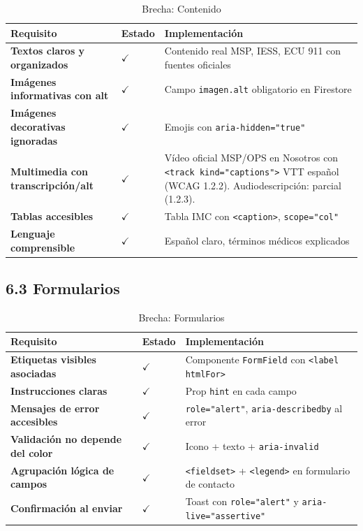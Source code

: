 \documentclass[12pt, a4paper]{article}
\newcommand{\cmark}{\textcolor{successgreen}{$\checkmark$}}
\begin{document}
\begin{table}[H]
\centering
\caption{Brecha: Contenido}
\small
\begin{tabular}{@{}>{\bfseries}p{5cm} >{\centering\arraybackslash}p{2cm} p{6.5cm}@{}}
\toprule
\rowcolor{royalblue!12}
\textbf{Requisito} & \textbf{Estado} & \textbf{Implementación} \\
\midrule
Textos claros y organizados & \cmark & Contenido real MSP, IESS, ECU 911 con fuentes oficiales \\
Imágenes informativas con alt & \cmark & Campo \texttt{imagen.alt} obligatorio en Firestore \\
Imágenes decorativas ignoradas & \cmark & Emojis con \texttt{aria-hidden="true"} \\
Multimedia con transcripción/alt & \cmark & Vídeo oficial MSP/OPS en Nosotros con \texttt{<track kind="captions">} VTT español (WCAG 1.2.2). Audiodescripción: parcial (1.2.3). \\
Tablas accesibles & \cmark & Tabla IMC con \texttt{<caption>}, \texttt{scope="col"} \\
Lenguaje comprensible & \cmark & Español claro, términos médicos explicados \\
\bottomrule
\end{tabular}
\end{table}

\subsection{6.3 Formularios}

\begin{table}[H]
\centering
\caption{Brecha: Formularios}
\small
\begin{tabular}{@{}>{\bfseries}p{5cm} >{\centering\arraybackslash}p{2cm} p{6.5cm}@{}}
\toprule
\rowcolor{royalblue!12}
\textbf{Requisito} & \textbf{Estado} & \textbf{Implementación} \\
\midrule
Etiquetas visibles asociadas & \cmark & Componente \texttt{FormField} con \texttt{<label htmlFor>} \\
Instrucciones claras & \cmark & Prop \texttt{hint} en cada campo \\
Mensajes de error accesibles & \cmark & \texttt{role="alert"}, \texttt{aria-describedby} al error \\
Validación no depende del color & \cmark & Icono + texto + \texttt{aria-invalid} \\
Agrupación lógica de campos & \cmark & \texttt{<fieldset>} + \texttt{<legend>} en formulario de contacto \\
Confirmación al enviar & \cmark & Toast con \texttt{role="alert"} y \texttt{aria-live="assertive"} \\
\bottomrule
\end{tabular}
\end{table}
\end{document}
